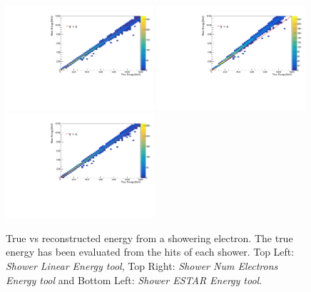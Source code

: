 \begin{figure}[h!]
    \centering
    \includegraphics[width = 0.49\textwidth]{figures-chap4/true_vs_reco_linear.pdf}
    \includegraphics[width = 0.49\textwidth]{figures-chap4/true_vs_reco_oldmethod.pdf}
    \includegraphics[width = 0.49\textwidth]{figures-chap4/true_vs_reco_ESTAR.pdf}
    \captionsetup{width=0.45\textwidth}
    \parbox[b]{0.49\textwidth}%
  {
    \caption[True vs reconstructed energy from a showering electron. The true energy has been evaluated from the hits of each shower.]
    {True vs reconstructed energy from a showering electron. The true energy has been evaluated from the hits of each shower. Top Left: \textit{Shower Linear Energy tool}, Top Right: \textit{Shower Num Electrons Energy tool} and Bottom Left: \textit{Shower ESTAR Energy tool}. \\}
    \label{fig:reco_vs_true_hit_level}}
\end{figure}


